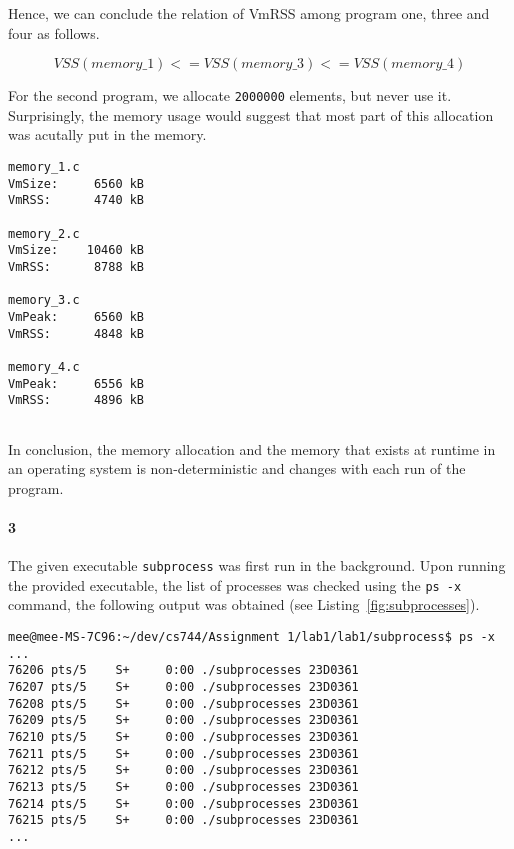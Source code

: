 \documentclass[final,5p,times,authoryear]{elsarticle}
\begin{document}
Hence, we can conclude the relation of VmRSS among program one, three and four as follows. 

$$ VSS(memory\_1) <= VSS(memory\_3) <= VSS(memory\_4)$$

For the second program, we allocate {\tt 2000000} elements, but never use it.
Surprisingly, the memory usage would suggest that most part of this allocation was acutally put in the memory.

\begin{lstlisting}[captionpos=b, caption={Snippet showing memory usage for {\tt memory\_1.c}, {\tt memory\_2.c}, {\tt memory\_3.c} and {\tt memory\_4.c}.},label={fig:proc2_mem},style=codeBash]
memory_1.c
VmSize:	    6560 kB
VmRSS:	    4740 kB

memory_2.c
VmSize:	   10460 kB
VmRSS:	    8788 kB

memory_3.c
VmPeak:	    6560 kB
VmRSS:	    4848 kB

memory_4.c
VmPeak:	    6556 kB
VmRSS:	    4896 kB
  
\end{lstlisting}

In conclusion, the memory allocation and the memory that exists at runtime in an operating system is non-deterministic and changes with each run of the program.


\pagebreak

\paragraph{\bf 3}
The given executable {\tt subprocess} was first run in the background.
Upon running the provided executable, the list of processes was checked using the {\tt ps -x} command, the following output was obtained (see Listing~\ref{fig:subprocesses}).  

\begin{lstlisting}[captionpos=b, caption={Snippet showing processes created by {\tt subprocess}.},label={fig:subprocesses},style=codeBash]
mee@mee-MS-7C96:~/dev/cs744/Assignment 1/lab1/lab1/subprocess$ ps -x
...
76206 pts/5    S+     0:00 ./subprocesses 23D0361
76207 pts/5    S+     0:00 ./subprocesses 23D0361
76208 pts/5    S+     0:00 ./subprocesses 23D0361
76209 pts/5    S+     0:00 ./subprocesses 23D0361
76210 pts/5    S+     0:00 ./subprocesses 23D0361
76211 pts/5    S+     0:00 ./subprocesses 23D0361
76212 pts/5    S+     0:00 ./subprocesses 23D0361
76213 pts/5    S+     0:00 ./subprocesses 23D0361
76214 pts/5    S+     0:00 ./subprocesses 23D0361
76215 pts/5    S+     0:00 ./subprocesses 23D0361
...
\end{lstlisting}
\end{document}
